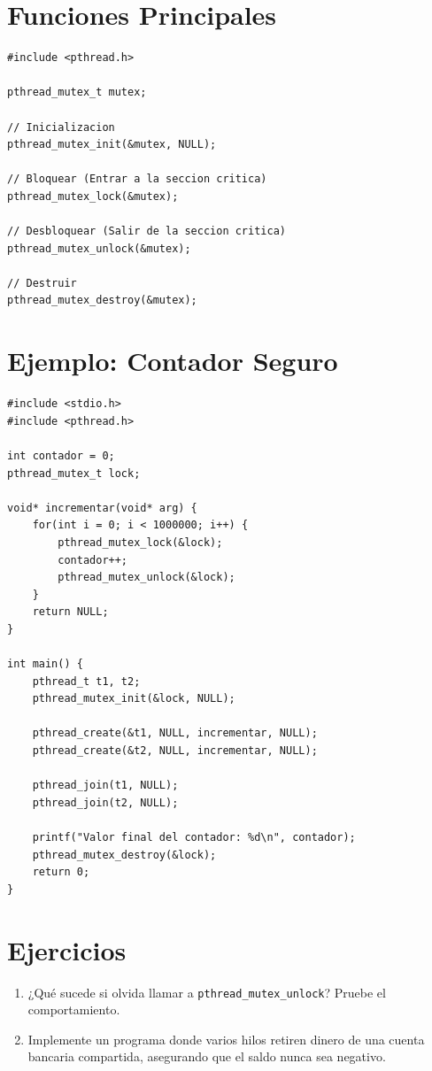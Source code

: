 \documentclass[12pt,a4paper]{article}
\begin{document}
\newpage

\section{Funciones Principales}
\begin{lstlisting}[numbers=none]
#include <pthread.h>

pthread_mutex_t mutex;

// Inicializacion
pthread_mutex_init(&mutex, NULL);

// Bloquear (Entrar a la seccion critica)
pthread_mutex_lock(&mutex);

// Desbloquear (Salir de la seccion critica)
pthread_mutex_unlock(&mutex);

// Destruir
pthread_mutex_destroy(&mutex);
\end{lstlisting}

\section{Ejemplo: Contador Seguro}
\begin{lstlisting}
#include <stdio.h>
#include <pthread.h>

int contador = 0;
pthread_mutex_t lock;

void* incrementar(void* arg) {
    for(int i = 0; i < 1000000; i++) {
        pthread_mutex_lock(&lock);
        contador++;
        pthread_mutex_unlock(&lock);
    }
    return NULL;
}

int main() {
    pthread_t t1, t2;
    pthread_mutex_init(&lock, NULL);

    pthread_create(&t1, NULL, incrementar, NULL);
    pthread_create(&t2, NULL, incrementar, NULL);

    pthread_join(t1, NULL);
    pthread_join(t2, NULL);

    printf("Valor final del contador: %d\n", contador);
    pthread_mutex_destroy(&lock);
    return 0;
}
\end{lstlisting}

\section{Ejercicios}
\begin{enumerate}
    \item ¿Qué sucede si olvida llamar a \texttt{pthread\_mutex\_unlock}? Pruebe el comportamiento.
    \item Implemente un programa donde varios hilos retiren dinero de una cuenta bancaria compartida, asegurando que el saldo nunca sea negativo.
\end{enumerate}
\end{document}
